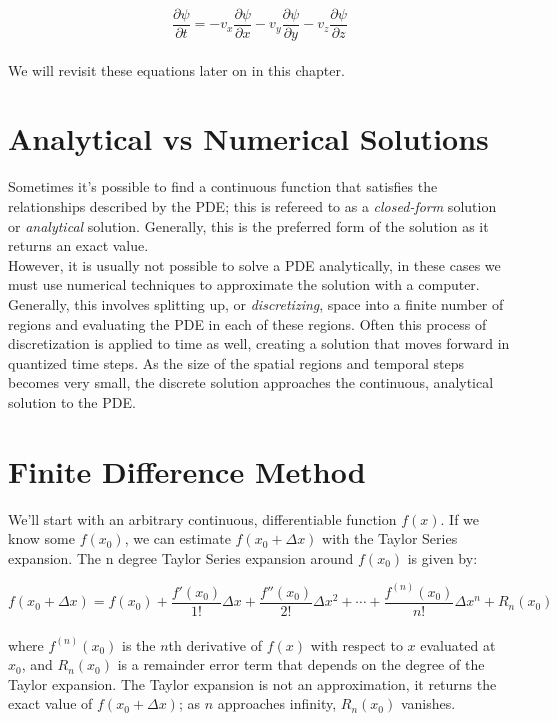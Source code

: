 {   \begin{equation}\label{eq:advection3d}
  \frac{\partial \psi}{\partial t} = -v_{x}\frac{\partial \psi}{\partial x}-v_{y}\frac{\partial \psi}{\partial y}-v_{z}\frac{\partial \psi}{\partial z}
  \end{equation}
  \\
  We will revisit these equations later on in this chapter.
   
\section{Analytical vs Numerical Solutions}

Sometimes it's possible to find a continuous function that satisfies the relationships described by the PDE; this is refereed to as a \textit{closed-form} solution or \textit{analytical} solution.  Generally, this is the preferred form of the solution as it returns an exact value.\\

However, it is usually not possible to solve a PDE analytically, in these cases we must use numerical techniques to approximate the solution with a computer.  Generally, this involves splitting up, or \textit{discretizing}, space into a finite number of regions and evaluating the PDE in each of these regions.  Often this process of discretization is applied to time as well, creating a solution that moves forward in quantized time steps.  As the size of the spatial regions and temporal steps becomes very small, the discrete solution approaches the continuous, analytical solution to the PDE.

\section{Finite Difference Method}

We'll start with an arbitrary continuous, differentiable function $f(x)$.  If we know some $f(x_{0})$, we can estimate $f(x_{0}+\Delta  x)$ with the Taylor Series expansion.  The n degree Taylor Series expansion around $f(x_{0})$ is given by:

 \begin{equation}\label{eq:norderTaylor}
  f(x_{0} + \Delta  x) = f(x_{0}) + \frac{f'(x_{0})}{1!}\Delta  x + \frac{f''(x_{0})}{2!}\Delta  x^{2} + \cdots  + \frac{f^{(n)}(x_{0})}{n!}\Delta  x^{n} + R_{n}(x_{0})
  \end{equation}
    \\
  where $f^{(n)}(x_{0})$ is the $n$th derivative of $f(x)$ with respect to $x$ evaluated at $x_{0}$, and $R_{n}(x_{0})$ is a remainder error term that depends on the degree of the Taylor expansion.  The Taylor expansion is not an approximation, it returns the exact value of $ f(x_{0} + \Delta  x)$; as $n$ approaches infinity, $R_{n}(x_{0})$ vanishes.\\
  
}
